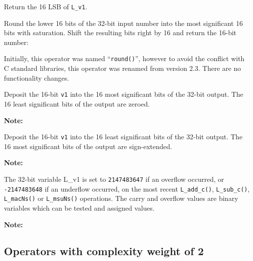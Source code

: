 Return the 16 LSB of {\tt L\_v1}.


Round the lower 16 bits of the 32-bit input number into the most
significant 16 bits with saturation. Shift the resulting bits
right by 16 and return the 16-bit number:


Initially, this operator was named ``{\tt round()}'', however to avoid
the conflict with C standard libraries, this operator was renamed from
version 2.3. There are no functionality changes.


Deposit the 16-bit {\tt v1} into the 16 most significant bits
of the 32-bit output. The 16 least significant bits of the output
are zeroed.

\textbf{Note:} \hfill {}


Deposit the 16-bit {\tt v1} into the 16 least significant bits
of the 32-bit output. The 16 most significant bits of the output
are sign-extended.

\textbf{Note:} \hfill {}


The 32-bit variable L\_v1 is set to {\tt 2147483647} if an overflow occurred, or {\tt -2147483648} if an underflow occurred, on the most recent {\tt L\_add\_c()}, {\tt L\_sub\_c()}, {\tt L\_macNs()} or {\tt L\_msuNs()} operations.
The carry and overflow values are binary variables which can be tested and assigned values.

\textbf{Note:} \hfill {}


\subsection{Operators with complexity weight of 2}


